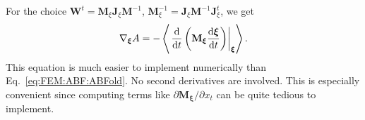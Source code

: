 For the choice $\mathbf{W}^t=\mathbf{M}_{\xi}\mathbf{J}_{\xi}\mathbf{M}^{-1}$, $\mathbf{M}_{\xi}^{-1}=\mathbf{J}_{\xi}\mathbf{M}^{-1}\mathbf{J}_{\xi}^t$, we get
\begin{equation}
    \nabla_{\boldsymbol{\xi}}A=-\left<\left.\frac{\mathop{}\!\mathrm{d}}{\mathop{}\!\mathrm{d} t}\left(\mathbf{M}_{\boldsymbol{\xi}}\frac{\mathop{}\!\mathrm{d} \boldsymbol{\xi}}{\mathop{}\!\mathrm{d} t}\right)\right|_{\boldsymbol{\xi}}\right>.
    \label{eq:FEM:ABF:ABFnew}
\end{equation}
This equation is much easier to implement numerically than Eq.~\ref{eq:FEM:ABF:ABFold}. No second derivatives are involved. This is especially convenient since computing terms like $\partial \mathbf{M}_{\boldsymbol{\xi}}/\partial x_t$ can be quite tedious to implement.